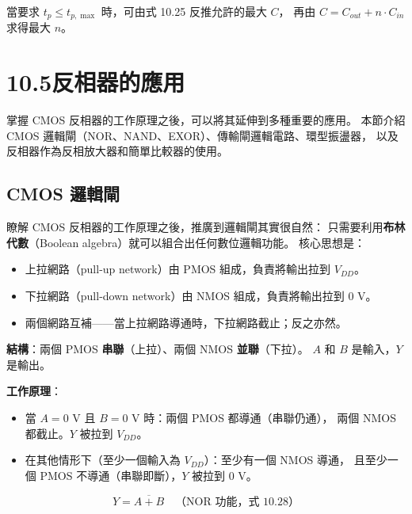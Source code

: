 \documentclass[12pt]{article}
\begin{document}
當要求 $t_p \le t_{p,\max}$ 時，可由式 10.25 反推允許的最大 $C$，
再由 $C = C_{out} + n \cdot C_{in}$ 求得最大 $n$。

\section*{10.5\quad 反相器的應用}

掌握 CMOS 反相器的工作原理之後，可以將其延伸到多種重要的應用。
本節介紹 CMOS 邏輯閘（NOR、NAND、EXOR）、傳輸閘邏輯電路、環型振盪器，
以及反相器作為反相放大器和簡單比較器的使用。

\subsection*{CMOS 邏輯閘}

瞭解 CMOS 反相器的工作原理之後，推廣到邏輯閘其實很自然：
只需要利用\textbf{布林代數}（Boolean algebra）就可以組合出任何數位邏輯功能。
核心思想是：
\begin{itemize}[leftmargin=2.2em,itemsep=2pt]
  \item 上拉網路（pull-up network）由 PMOS 組成，負責將輸出拉到 $V_{DD}$。
  \item 下拉網路（pull-down network）由 NMOS 組成，負責將輸出拉到 0 V。
  \item 兩個網路互補——當上拉網路導通時，下拉網路截止；反之亦然。
\end{itemize}

\begin{keybox}
\textbf{結構}：兩個 PMOS \textbf{串聯}（上拉）、兩個 NMOS \textbf{並聯}（下拉）。
$A$ 和 $B$ 是輸入，$Y$ 是輸出。

\textbf{工作原理}：
\begin{itemize}[leftmargin=2.2em,itemsep=1pt]
  \item 當 $A = 0$ V 且 $B = 0$ V 時：兩個 PMOS 都導通（串聯仍通），
    兩個 NMOS 都截止。$Y$ 被拉到 $V_{DD}$。
  \item 在其他情形下（至少一個輸入為 $V_{DD}$）：至少有一個 NMOS 導通，
    且至少一個 PMOS 不導通（串聯即斷），$Y$ 被拉到 0 V。
\end{itemize}

\begin{formulabox}
\[
  Y = \overline{A + B} \quad\text{（NOR 功能，式 10.28）}
\]
\end{formulabox}
\end{keybox}
\end{document}
